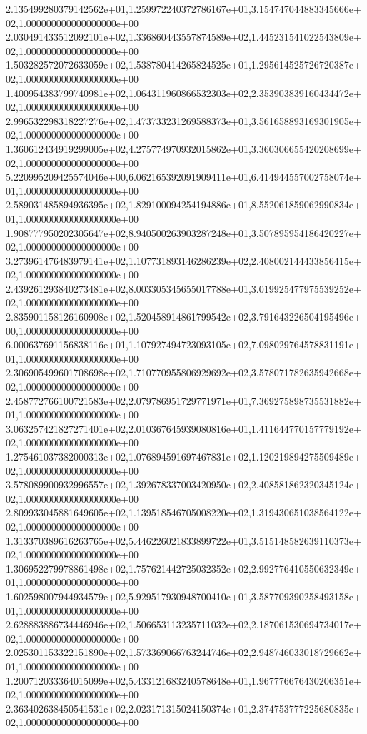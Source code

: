 2.135499280379142562e+01,1.259972240372786167e+01,3.154747044883345666e+02,1.000000000000000000e+00
2.030491433512092101e+02,1.336860443557874589e+02,1.445231541022543809e+02,1.000000000000000000e+00
1.503282572072633059e+02,1.538780414265824525e+01,1.295614525726720387e+02,1.000000000000000000e+00
1.400954383799740981e+02,1.064311960866532303e+02,2.353903839160434472e+02,1.000000000000000000e+00
2.996532298318227276e+02,1.473733231269588373e+01,3.561658893169301905e+02,1.000000000000000000e+00
1.360612434919299005e+02,4.275774970932015862e+01,3.360306655420208699e+02,1.000000000000000000e+00
5.220995209425574046e+00,6.062165392091909411e+01,6.414944557002758074e+01,1.000000000000000000e+00
2.589031485894936395e+02,1.829100094254194886e+01,8.552061859062990834e+01,1.000000000000000000e+00
1.908777950202305647e+02,8.940500263903287248e+01,3.507895954186420227e+02,1.000000000000000000e+00
3.273961476483979141e+02,1.107731893146286239e+02,2.408002144433856415e+02,1.000000000000000000e+00
2.439261293840273481e+02,8.003305345655017788e+01,3.019925477975539252e+02,1.000000000000000000e+00
2.835901158126160908e+02,1.520458914861799542e+02,3.791643226504195496e+00,1.000000000000000000e+00
6.000637691156838116e+01,1.107927494723093105e+02,7.098029764578831191e+01,1.000000000000000000e+00
2.306905499601708698e+02,1.710770955806929692e+02,3.578071782635942668e+02,1.000000000000000000e+00
2.458772766100721583e+02,2.079786951729771971e+01,7.369275898735531882e+01,1.000000000000000000e+00
3.063257421827271401e+02,2.010367645939080816e+01,1.411644770157779192e+02,1.000000000000000000e+00
1.275461037382000313e+02,1.076894591697467831e+02,1.120219894275509489e+02,1.000000000000000000e+00
3.578089900932996557e+02,1.392678337003420950e+02,2.408581862320345124e+02,1.000000000000000000e+00
2.809933045881649605e+02,1.139518546705008220e+02,1.319430651038564122e+02,1.000000000000000000e+00
1.313370389616263765e+02,5.446226021833899722e+01,3.515148582639110373e+02,1.000000000000000000e+00
1.306952279978861498e+02,1.757621442725032352e+02,2.992776410550632349e+01,1.000000000000000000e+00
1.602598007944934579e+02,5.929517930948700410e+01,3.587709390258493158e+01,1.000000000000000000e+00
2.628883886734446946e+02,1.506653113235711032e+02,2.187061530694734017e+02,1.000000000000000000e+00
2.025301153322151890e+02,1.573369066763244746e+02,2.948746033018729662e+01,1.000000000000000000e+00
1.200712033364015099e+02,5.433121683240578648e+01,1.967776676430206351e+02,1.000000000000000000e+00
2.363402638450541531e+02,2.023171315024150374e+01,2.374753777225680835e+02,1.000000000000000000e+00
